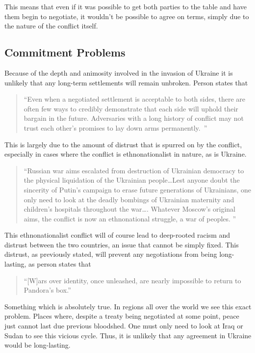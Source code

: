 \documentclass{article}
\begin{document}
        This means that even if it was possible to get both parties to the table and have them begin to negotiate, it wouldn't be possible to agree on terms, simply due to the nature of the conflict itself.   

    \subsection{Commitment Problems}

        Because of the depth and animosity involved in the invasion of Ukraine it is unlikely that any long-term settlements will remain unbroken. Person states that
        \begin{quote}
            ``Even when a negotiated settlement is acceptable to both sides, there are often few ways to credibly demonstrate that each side will uphold their bargain in the future. Adversaries with a long history of conflict may not trust each other’s promises to lay down arms permanently.~\parencite{person_2025}''
        \end{quote}

        This is largely due to the amount of distrust that is spurred on by the conflict, especially in cases where the conflict is ethnonationalist in nature, as is Ukraine. 

        \begin{quote}
           ``Russian war aims escalated from destruction of Ukrainian democracy to the physical liquidation of the Ukrainian people\ldots Lest anyone doubt the sincerity of Putin’s campaign to erase future generations of Ukrainians, one only need to look at the deadly bombings of Ukrainian maternity and children’s hospitals throughout the war\ldots. Whatever Moscow’s original aims, the conflict is now an ethnonational struggle, a war of peoples. '' \parencite{person_2025}
        \end{quote}

        This ethnonationalist conflict will of course lead to deep-rooted racism and distrust between the two countries, an issue that cannot be simply fixed. This distrust, as previously stated, will prevent any negotiations from being long-lasting, as person states that

        \begin{quote}
            ``[W]ars over identity, once unleashed, are nearly impossible to return to Pandora’s box.''
        \end{quote}

        Something which is absolutely true. In regions all over the world we see this exact problem. Places where, despite a treaty being negotiated at some point, peace just cannot last due previous bloodshed. One must only need to look at Iraq or Sudan to see this vicious cycle. Thus, it is unlikely that any agreement in Ukraine would be long-lasting. 
\end{document}

